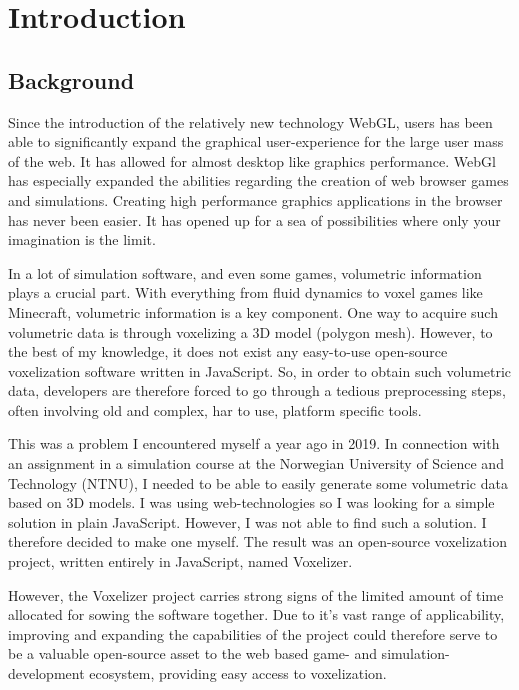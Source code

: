 \chapter[Introductions]{Introduction}
\section{Background}
Since the introduction of the relatively new technology WebGL, users has been able to significantly expand the graphical user-experience for the large user mass of the web. It has allowed for almost desktop like graphics performance.
WebGl has especially expanded the abilities regarding the creation of web browser games and simulations. Creating high performance graphics applications in the browser has never been easier. It has opened up for a sea of possibilities where only your imagination is the limit.

In a lot of simulation software, and even some games, volumetric information plays a crucial part. With everything from fluid dynamics to voxel games like Minecraft, volumetric information is a key component. One way to acquire such volumetric data is through voxelizing a 3D model (polygon mesh). However, to the best of my knowledge, it does not exist any easy-to-use open-source voxelization software written in JavaScript. So, in order to obtain such volumetric data, developers are therefore forced to go through a tedious preprocessing steps, often involving old and complex, har to use, platform specific tools.

This was a problem I encountered myself a year ago in 2019. In connection with an assignment in a simulation course at the Norwegian University of Science and Technology (NTNU), I needed to be able to easily generate some volumetric data based on 3D models. I was using web-technologies so I was looking for a simple solution in plain JavaScript. However, I was not able to find such a solution. I therefore decided to make one myself. The result was an open-source voxelization project, written entirely in JavaScript, named Voxelizer.

However, the Voxelizer project carries strong signs of the limited amount of time allocated for sowing the software together. Due to it's vast range of applicability, improving and expanding the capabilities of the project could therefore serve to be a valuable open-source asset to the web based game- and simulation-development ecosystem, providing easy access to voxelization.

